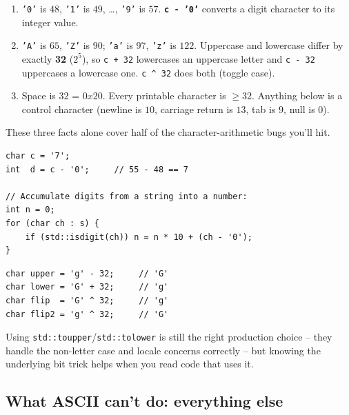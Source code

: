 \documentclass[11pt]{article}
\begin{document}
\begin{ideabox}
\begin{enumerate}[leftmargin=*,noitemsep]
    \item \texttt{'0'} is $48$, \texttt{'1'} is $49$, \ldots, \texttt{'9'} is $57$.
          \textbf{\texttt{c - '0'}} converts a digit character to its integer value.
    \item \texttt{'A'} is $65$, \texttt{'Z'} is $90$; \texttt{'a'} is
          $97$, \texttt{'z'} is $122$. Uppercase and lowercase differ
          by exactly \textbf{32} ($2^5$), so \texttt{c + 32} lowercases an
          uppercase letter and \texttt{c - 32} uppercases a lowercase
          one. \texttt{c \textasciicircum\ 32} does both (toggle case).
    \item Space is $32$ = $0x20$. Every printable character is $\ge 32$.
          Anything below is a control character (newline is $10$,
          carriage return is $13$, tab is $9$, null is $0$).
\end{enumerate}
These three facts alone cover half of the character-arithmetic bugs
you'll hit.
\end{ideabox}

\begin{examplebox}
\begin{verbatim}
char c = '7';
int  d = c - '0';     // 55 - 48 == 7

// Accumulate digits from a string into a number:
int n = 0;
for (char ch : s) {
    if (std::isdigit(ch)) n = n * 10 + (ch - '0');
}
\end{verbatim}
\end{examplebox}

\begin{examplebox}
\begin{verbatim}
char upper = 'g' - 32;     // 'G'
char lower = 'G' + 32;     // 'g'
char flip  = 'G' ^ 32;     // 'g'
char flip2 = 'g' ^ 32;     // 'G'
\end{verbatim}
Using \texttt{std::toupper}/\texttt{std::tolower} is still the right
production choice -- they handle the non-letter case and locale
concerns correctly -- but knowing the underlying bit trick helps when
you read code that uses it.
\end{examplebox}

\subsection{What ASCII can't do: everything else}
\end{document}
